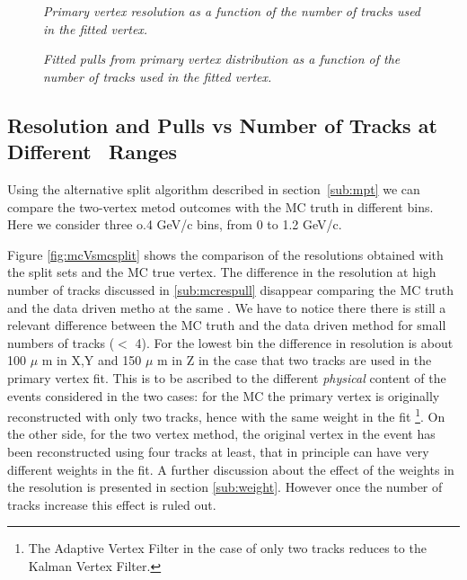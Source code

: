 \begin{figure}[htb]
\begin{center}
\centerline{
}
\caption{\sl
Primary vertex resolution as a function of the number of tracks used in the fitted vertex. 
}
\label{fig:resvsntrk-900MC}
\end{center}
\begin{center}
\centerline{
}
\caption{\sl
Fitted pulls from primary vertex distribution as a function of the number of tracks used in the 
fitted vertex.}
\label{fig:pullvsntrk-900MC}
\end{center}
\end{figure}


\subsection{Resolution and Pulls vs Number of Tracks at Different \pt\, Ranges}
\label{sub:mcpt}

Using the alternative split algorithm described in section~\ref{sub:mpt} we can compare the 
two-vertex metod outcomes with the MC truth in different \ptm bins. Here we consider three o.4 GeV/c \ptm bins, from 0 to 1.2 GeV/c.

Figure \ref{fig:mcVsmcsplit} shows the comparison of the resolutions obtained with the split sets and the MC true vertex. The difference in the resolution at high number of tracks discussed in \ref{sub:mcrespull} disappear comparing the MC truth and the data driven metho at the same \ptm. We have to notice there there is still a relevant difference between the MC truth and the data driven method for small numbers of tracks ($<$ 4). For the lowest \ptm bin the difference in resolution is about 100 $\mu$ m in X,Y and 150 $\mu$ m in Z in the case that two tracks are used in the primary vertex fit. This is to be ascribed to the different \emph{physical} content of the events considered in the two cases: for the MC the primary vertex is originally reconstructed with only two tracks, hence with the same weight in the fit \footnote{The Adaptive Vertex Filter in the case of only two tracks reduces to the Kalman Vertex Filter.}. On the other side, for the two vertex method, the original vertex in the event has been reconstructed using four tracks at least, that in principle can have very different weights in the fit. A further discussion about the effect of the weights in the resolution is presented in section \ref{sub:weight}. However once the number of tracks increase this effect is ruled out. 

